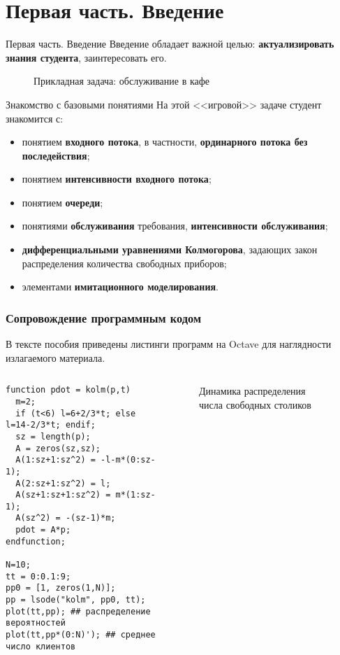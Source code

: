 \documentclass[10pt]{beamer}
\begin{document}
\section{Первая часть. Введение}
\begin{frame}{Первая часть. Введение}
Введение обладает важной целью: \textbf{актуализировать знания студента}, заинтересовать его. 
  \begin{figure}[h]
    \centering
    \caption{Прикладная задача: обслуживание в кафе}
    \label{VK:fig:2}
  \end{figure}
\end{frame}

\begin{frame}{Знакомство с базовыми понятиями}
На этой <<игровой>> задаче студент знакомится с:
\begin{itemize}
    \item понятием \textbf{входного потока}, в частности, \textbf{ординарного потока без последействия};
    \item понятием \textbf{интенсивности входного потока};
    \item понятием \textbf{очереди};
    \item понятиями \textbf{обслуживания} требования, \textbf{интенсивности обслуживания};
    \item \textbf{дифференциальными уравнениями Колмогорова}, задающих закон распределения количества свободных приборов;
    \item элементами \textbf{имитационного моделирования}.
\end{itemize}
\end{frame}



\begin{frame}[fragile]
\frametitle{Сопровождение программным кодом}
В тексте пособия приведены листинги программ на Octave для наглядности излагаемого материала. 
\begin{columns}[T] %
\begin{column}{0.55\textwidth}
\begin{Verbatim}[label=Решение уравнений Колмогорова,fontsize=\scriptsize,baselinestretch=1,frame=single,xleftmargin=1em]
function pdot = kolm(p,t)
  m=2;
  if (t<6) l=6+2/3*t; else l=14-2/3*t; endif;
  sz = length(p);
  A = zeros(sz,sz);
  A(1:sz+1:sz^2) = -l-m*(0:sz-1);
  A(2:sz+1:sz^2) = l;
  A(sz+1:sz+1:sz^2) = m*(1:sz-1);
  A(sz^2) = -(sz-1)*m;
  pdot = A*p;
endfunction;

N=10;
tt = 0:0.1:9;
pp0 = [1, zeros(1,N)];
pp = lsode("kolm", pp0, tt);
plot(tt,pp); ## распределение вероятностей
plot(tt,pp*(0:N)'); ## среднее число клиентов
\end{Verbatim}
\end{column}
\hfill%
\begin{column}{0.45\textwidth}
\begin{figure}[h]
    \centering
    \caption{Динамика распределения числа свободных столиков}
  \end{figure}
\end{column}
\end{columns}
\end{frame}
\end{document}
